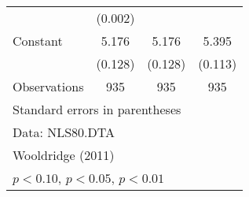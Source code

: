 \begin{table}[htbp]
\begin{tabular}{l*{3}{c}}
                    &     (0.002)         &                     &                     \\
\addlinespace
Constant            &       5.176\sym{***}&       5.176\sym{***}&       5.395\sym{***}\\
                    &     (0.128)         &     (0.128)         &     (0.113)         \\
\midrule
Observations        &         935         &         935         &         935         \\
\bottomrule
\multicolumn{4}{l}{\footnotesize Standard errors in parentheses}\\
\multicolumn{4}{l}{\footnotesize Data: NLS80.DTA}\\
\multicolumn{4}{l}{\footnotesize Wooldridge (2011)}\\
\multicolumn{4}{l}{\footnotesize \sym{*} \(p<0.10\), \sym{**} \(p<0.05\), \sym{***} \(p<0.01\)}\\
\end{tabular}
\end{table}
